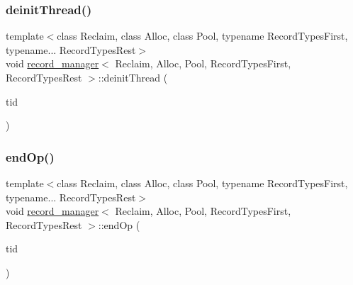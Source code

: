 \mbox{\label{classrecord__manager_a3e2437bdf46d90f3feb3a140e9a0d223}} 
\subsubsection{\texorpdfstring{deinit\+Thread()}{deinitThread()}}
{\footnotesize\ttfamily template$<$class Reclaim, class Alloc, class Pool, typename Record\+Types\+First, typename... Record\+Types\+Rest$>$ \\
void \hyperlink{classrecord__manager}{record\+\_\+manager}$<$ Reclaim, Alloc, Pool, Record\+Types\+First, Record\+Types\+Rest $>$\+::deinit\+Thread (\begin{DoxyParamCaption}\item[{const int}]{tid }\end{DoxyParamCaption})\hspace{0.3cm}{\ttfamily [inline]}}

\mbox{\label{classrecord__manager_a15c7aa67b296aa1eaa34def07d012aa1}} 
\subsubsection{\texorpdfstring{end\+Op()}{endOp()}}
{\footnotesize\ttfamily template$<$class Reclaim, class Alloc, class Pool, typename Record\+Types\+First, typename... Record\+Types\+Rest$>$ \\
void \hyperlink{classrecord__manager}{record\+\_\+manager}$<$ Reclaim, Alloc, Pool, Record\+Types\+First, Record\+Types\+Rest $>$\+::end\+Op (\begin{DoxyParamCaption}\item[{const int}]{tid }\end{DoxyParamCaption})\hspace{0.3cm}{\ttfamily [inline]}}

\mbox{\label{classrecord__manager_a3d009645b6ae65ced7f8b9cff3f3cf09}} 
